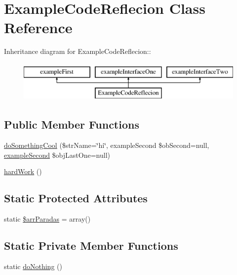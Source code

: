 \hypertarget{class_example_code_reflecion}{
\section{ExampleCodeReflecion Class Reference}
\label{class_example_code_reflecion}
}
Inheritance diagram for ExampleCodeReflecion::\begin{figure}[H]
\begin{center}
\leavevmode
\includegraphics[height=2cm]{class_example_code_reflecion}
\end{center}
\end{figure}
\subsection*{Public Member Functions}
\begin{CompactItemize}
\item 
\hyperlink{class_example_code_reflecion_bf19f7a457cf5f0e92ecd5f42e76018e}{doSomethingCool} (\$strName=\char`\"{}hi\char`\"{}, exampleSecond \$obSecond=null, \hyperlink{classexample_second}{exampleSecond} \$objLastOne=null)
\item 
\hyperlink{class_example_code_reflecion_7d29a36398226ef64512719c29c01a0f}{hardWork} ()
\end{CompactItemize}
\subsection*{Static Protected Attributes}
\begin{CompactItemize}
\item 
static \hyperlink{class_example_code_reflecion_b1f249f4c625c843e88d641a6a71199a}{\$arrParadas} = array()
\end{CompactItemize}
\subsection*{Static Private Member Functions}
\begin{CompactItemize}
\item 
static \hyperlink{class_example_code_reflecion_82081362ac40db52076731b35d8aa5f4}{doNothing} ()
\end{CompactItemize}
